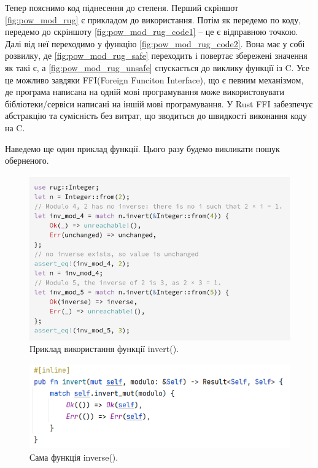 \begin{itemize}
	Тепер пояснимо код піднесення до степеня. Перший скріншот \ref{fig:pow_mod_rug} є прикладом до використання. Потім як передемо по коду, передемо до скріншоту \ref{fig:pow_mod_rug_code1} -- це є відправною точкою. Далі від неї переходимо у функцію \ref{fig:pow_mod_rug_code2}. Вона має у собі розвилку, де \ref{fig:pow_mod_rug_safe} переходить і повертає збережені значення як такі є, а \ref{fig:pow_mod_rug_unsafe} спускається до виклику функції із C. Усе це можливо завдяки FFI(Foreign Funciton Interface), що є певним механізмом, де програма написана на одній мові програмування може використовувати бібліотеки/сервіси написані на іншій мові програмування. У Rust FFI забезпечує абстракцію та сумісність без витрат, що зводиться до швидкості виконання коду на C. 
 
    Наведемо ще один приклад функції. Цього разу будемо викликати пошук оберненого.
	
	\begin{figure}[!h]
    		\centering
    		\includegraphics[scale = 0.45]{IMAGES/Rust/inverse_rug_example}
    		\caption{Приклад використання функції invert().}
    		\label{fig:inverse_rug_example}
	\end{figure}
	
	\begin{figure}[!h]
    		\centering
    		\includegraphics[scale = 0.45]{IMAGES/Rust/inverse_rug_code1}
    		\caption{Сама функція inverse().}
    		\label{fig:inverse_rug_code1}
	\end{figure}
	

\end{itemize}
